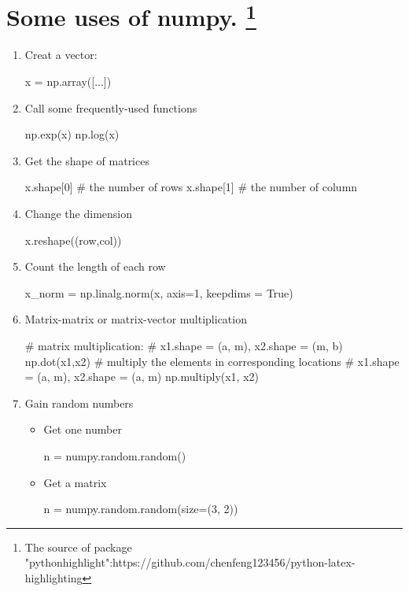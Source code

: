 \documentclass{article}
\begin{document}
\section{Some uses of numpy. \protect\footnote{The source of package "pythonhighlight":https://github.com/chenfeng123456/python-latex-highlighting}}
\begin{enumerate}
\item Creat a vector:
\begin{python}
x = np.array([...])
\end{python}

\item Call some frequently-used functions
\begin{python}
np.exp(x)
np.log(x)
\end{python}

\item Get the shape of matrices
\begin{python}[language=Python]
x.shape[0] # the number of rows
x.shape[1] # the number of column
\end{python}

\item Change the dimension
\begin{python}
x.reshape((row,col))
\end{python}

\item Count the length of each row
\begin{python}
x_norm = np.linalg.norm(x, axis=1, keepdims = True)
\end{python}

\item Matrix-matrix or matrix-vector multiplication
\begin{python}
# matrix multiplication: 
# x1.shape = (a, m), x2.shape = (m, b)
np.dot(x1,x2) 
# multiply the elements in corresponding locations
# x1.shape = (a, m), x2.shape = (a, m)
np.multiply(x1, x2) 
\end{python}

\item Gain random numbers

\begin{itemize}

\item Get one number
\begin{python}
n = numpy.random.random()
\end{python}

\item Get a matrix
\begin{python}
n = numpy.random.random(size=(3, 2))
\end{python}


\end{itemize}
\end{enumerate}
\end{document}
